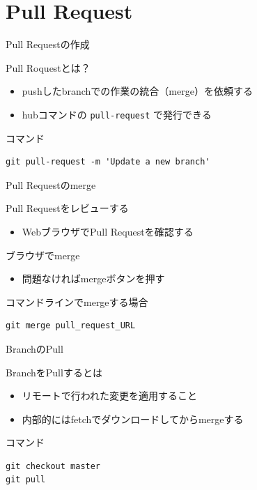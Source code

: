 \documentclass[t, aspectratio=169]{beamer}
\begin{document}
\section{Pull Request}
\label{sec-3-4}
\begin{frame}[fragile,label=sec-3-4-1]{Pull Requestの作成}
 \begin{block}{Pull Roquestとは？}
\begin{itemize}
\item pushしたbranchでの作業の統合（merge）を依頼する
\item hubコマンドの \texttt{pull-request} で発行できる
\end{itemize}
\end{block}

\begin{block}{コマンド}
\begin{verbatim}
git pull-request -m 'Update a new branch'
\end{verbatim}
\end{block}
\end{frame}

\begin{frame}[fragile,label=sec-3-4-2]{Pull Requestのmerge}
 \begin{block}{Pull Requestをレビューする}
\begin{itemize}
\item WebブラウザでPull Requestを確認する
\end{itemize}
\end{block}
\begin{block}{ブラウザでmerge}
\begin{itemize}
\item 問題なければmergeボタンを押す
\end{itemize}
\end{block}
\begin{block}{コマンドラインでmergeする場合}
\begin{verbatim}
git merge pull_request_URL
\end{verbatim}
\end{block}
\end{frame}

\begin{frame}[fragile,label=sec-3-4-3]{BranchのPull}
 \begin{block}{BranchをPullするとは}
\begin{itemize}
\item リモートで行われた変更を適用すること
\item 内部的にはfetchでダウンロードしてからmergeする
\end{itemize}
\end{block}
\begin{block}{コマンド}
\begin{verbatim}
git checkout master
git pull
\end{verbatim}
\end{block}
\end{frame}
\end{document}
